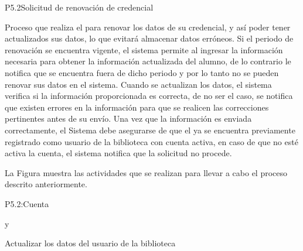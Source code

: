 
\begin{Proceso}{P5.2}{Solicitud de renovación de credencial} {
  

  Proceso que realiza el  para renovar los datos de su credencial, y así poder tener
  actualizados sus datos, lo que evitará almacenar datos erróneos.
  Si el periodo de renovación se encuentra vigente, el sistema permite al  ingresar la
  información necesaria para obtener la información actualizada del alumno, de lo contrario le
  notifica que se encuentra fuera de dicho periodo y por lo tanto no se pueden renovar sus datos en
  el sistema. Cuando se actualizan los datos, el sistema verifica si la información proporcionada es
  correcta, de no ser el caso, se notifica que existen errores en la información para que se realicen las
  correcciones pertinentes antes de su envío.
  Una vez que la información es enviada correctamente, el Sistema debe asegurarse de que el
   ya se encuentra previamente registrado como usuario de la biblioteca con cuenta activa,
  en caso de que no esté activa la cuenta, el sistema notifica que la solicitud no procede.


  \noindent La Figura  muestra las actividades que se realizan para llevar a cabo el proceso descrito anteriormente.


} {P5.2:Cuenta}


   { %
     y 
  }

   { %
    Actualizar los datos del usuario de la biblioteca
  }


\end{Proceso}

